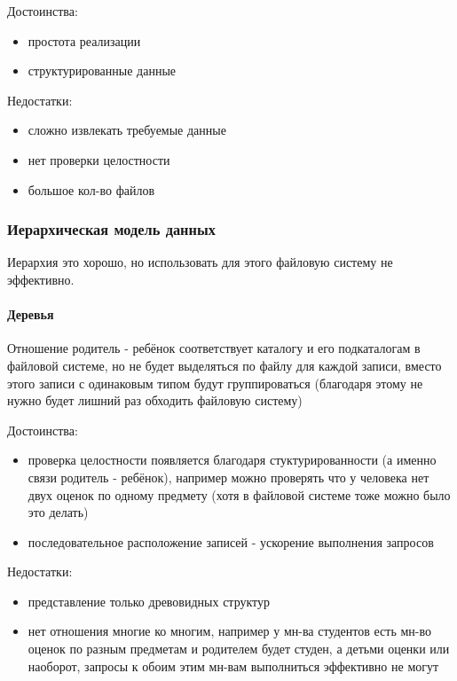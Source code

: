 Достоинства:
\begin{itemize}
    \item простота реализации
    \item структурированные данные
\end{itemize}

Недостатки:
\begin{itemize}
    \item сложно извлекать требуемые данные
    \item нет проверки целостности
    \item большое кол-во файлов
\end{itemize}

\subsubsection{Иерархическая модель данных}
\begin{remark}
    Иерархия это хорошо, но использовать для этого файловую
    систему не эффективно.
\end{remark}

\paragraph{Деревья}
Отношение родитель - ребёнок соответствует каталогу
и его подкаталогам в файловой системе, но не будет
выделяться по файлу для каждой записи, вместо этого
записи с одинаковым типом будут группироваться
(благодаря этому не нужно будет лишний раз обходить
файловую систему)

\enewline

Достоинства:
\begin{itemize}
    \item проверка целостности появляется благодаря
стуктурированности (а именно связи родитель
- ребёнок), например можно проверять что у человека нет
двух оценок по одному предмету (хотя в файловой системе
тоже можно было это делать)
    \item последовательное расположение записей - ускорение
выполнения запросов
\end{itemize}

Недостатки:
\begin{itemize}
    \item представление только древовидных структур
    \item нет отношения многие ко многим, например
у мн-ва студентов есть мн-во оценок по разным предметам
и родителем будет студен, а детьми оценки или наоборот,
запросы к обоим этим мн-вам выполниться эффективно не могут
\end{itemize}

